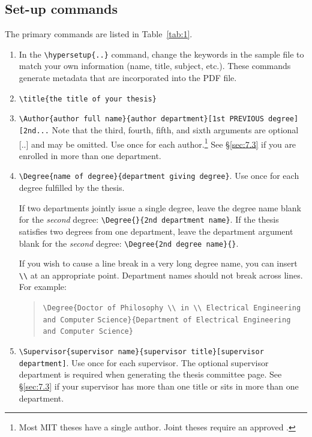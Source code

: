 \documentclass[11pt]{article}
\begin{document}
\subsection{Set-up commands} 
The primary commands are listed in Table~\ref{tab:1}.
\begin{enumerate}
\item In the \verb|\hypersetup{..}| command, change the keywords in the sample file to match your own information (name, title, subject, etc.). These commands generate metadata that are incorporated into the PDF file.  

\item \verb|\title{the title of your thesis}|

\item \verb|\Author{author full name}{author department}[1st PREVIOUS degree][2nd...| \linebreak
Note that the third, fourth, fifth, and sixth arguments are optional [..] and may be omitted.  Use once for each author.\footnote{Most MIT theses have a single author. Joint theses require an approved .} See \S\ref{sec:7.3} if you are enrolled in more than one department.

\item \verb|\Degree{name of degree}{department giving degree}|. Use once for each degree fulfilled by the thesis. 

If two departments jointly issue a single degree, leave the degree name blank for the \emph{second} degree: 
\verb|\Degree{}{2nd department name}|.  
If the thesis satisfies two degrees from one department, leave the department argument blank for 
the \emph{second} degree: \verb|\Degree{2nd degree name}{}|. 

If you wish to cause a line break in a very long degree name, you can insert \verb|\\| at an appropriate point.
Department names should not break across lines.  For example:
\begin{quote}
\verb|\Degree{Doctor of Philosophy \\ in \\ Electrical Engineering and Computer|\linebreak
\hbox{}\qquad\verb|Science}{Department of Electrical Engineering and Computer Science}|
\end{quote}

\item \verb|\Supervisor{supervisor name}{supervisor title}[supervisor department]|. Use once for each supervisor.  The optional supervisor department is required when generating the thesis committee page. See \S\ref{sec:7.3} if your supervisor has more than one title or sits in more than one department.


\end{enumerate}
\end{document}
